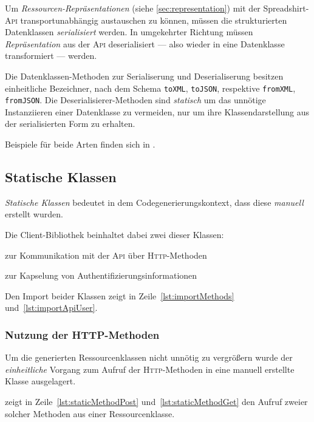 Um \emph{Ressourcen-Repräsentationen} (siehe \cref{sec:representation}) mit der Spreadshirt-\textsc{Api} transportunabhängig austauschen zu können, müssen die strukturierten Datenklassen \emph{serialisiert} werden. In umgekehrter Richtung müssen \emph{Repräsentation} aus der \textsc{Api} deserialisiert --- also wieder in eine Datenklasse transformiert --- werden.

Die Datenklassen-Methoden zur Serialiserung und Deserialiserung besitzen einheitliche Bezeichner, nach dem Schema \texttt{toXML}, \texttt{toJSON}, respektive \texttt{fromXML}, \texttt{fromJSON}. Die Deserialisierer-Methoden sind \emph{statisch} um das unnötige Instanziieren einer Datenklasse zu vermeiden, nur um ihre Klassendarstellung aus der serialisierten Form zu erhalten.

Beispiele für beide Arten finden sich in .

\subsection{Statische Klassen}
\label{sec:static_classes}

\emph{Statische Klassen} bedeutet in dem Codegenerierungskontext, dass diese \emph{manuell} erstellt wurden. 

Die Client-Bibliothek beinhaltet dabei zwei dieser Klassen:
\begin{compactenum}
    \item zur Kommunikation mit der \textsc{Api} über \textsc{Http}-Methoden
    \item zur Kapselung von Authentifizierungsinformationen
\end{compactenum}

Den Import beider Klassen zeigt  in Zeile~\ref{lst:importMethods} und~\ref{lst:importApiUser}.

\subsubsection{Nutzung der HTTP-Methoden}
\label{sec:staticMethodsClass}

Um die generierten Ressourcenklassen nicht unnötig zu vergrößern wurde der \emph{einheitliche} Vorgang zum Aufruf der \textsc{Http}-Methoden in eine manuell erstellte Klasse ausgelagert.

 zeigt in Zeile~\ref{lst:staticMethodPost} und~\ref{lst:staticMethodGet} den Aufruf zweier solcher Methoden aus einer Ressourcenklasse.

